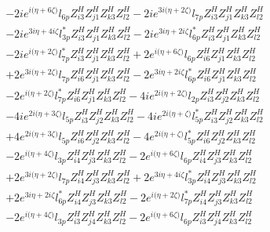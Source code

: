 \begin{align}
 &-2 i e^{i \Big(\eta +6 \zeta \Big)} l_{6p} Z_{{i 3}}^{H} Z_{{j 1}}^{H} Z_{{k 3}}^{H} Z_{{l 2}}^{H} -2 i e^{3 i \Big(\eta +2 \zeta \Big)} l_{7p} Z_{{i 3}}^{H} Z_{{j 1}}^{H} Z_{{k 3}}^{H} Z_{{l 2}}^{H} \nonumber \\ 
 &-2 i e^{3 i \eta +4 i \zeta } l_{3p}^* Z_{{i 3}}^{H} Z_{{j 1}}^{H} Z_{{k 3}}^{H} Z_{{l 2}}^{H} -2 i e^{3 i \eta +2 i \zeta } l_{6p}^* Z_{{i 3}}^{H} Z_{{j 1}}^{H} Z_{{k 3}}^{H} Z_{{l 2}}^{H} \nonumber \\ 
 &-2 i e^{i \Big(\eta +2 \zeta \Big)} l_{7p}^* Z_{{i 3}}^{H} Z_{{j 1}}^{H} Z_{{k 3}}^{H} Z_{{l 2}}^{H} +2 e^{i \Big(\eta +6 \zeta \Big)} l_{6p} Z_{{i 6}}^{H} Z_{{j 1}}^{H} Z_{{k 3}}^{H} Z_{{l 2}}^{H} \nonumber \\ 
 &+2 e^{3 i \Big(\eta +2 \zeta \Big)} l_{7p} Z_{{i 6}}^{H} Z_{{j 1}}^{H} Z_{{k 3}}^{H} Z_{{l 2}}^{H} -2 e^{3 i \eta +2 i \zeta } l_{6p}^* Z_{{i 6}}^{H} Z_{{j 1}}^{H} Z_{{k 3}}^{H} Z_{{l 2}}^{H} \nonumber \\ 
 &-2 e^{i \Big(\eta +2 \zeta \Big)} l_{7p}^* Z_{{i 6}}^{H} Z_{{j 1}}^{H} Z_{{k 3}}^{H} Z_{{l 2}}^{H} -4 i e^{2 i \Big(\eta +2 \zeta \Big)} l_{2p} Z_{{i 3}}^{H} Z_{{j 2}}^{H} Z_{{k 3}}^{H} Z_{{l 2}}^{H} \nonumber \\ 
 &-4 i e^{2 i \Big(\eta +3 \zeta \Big)} l_{5p} Z_{{i 3}}^{H} Z_{{j 2}}^{H} Z_{{k 3}}^{H} Z_{{l 2}}^{H} -4 i e^{2 i \Big(\eta +\zeta \Big)} l_{5p}^* Z_{{i 3}}^{H} Z_{{j 2}}^{H} Z_{{k 3}}^{H} Z_{{l 2}}^{H} \nonumber \\ 
 &+4 e^{2 i \Big(\eta +3 \zeta \Big)} l_{5p} Z_{{i 6}}^{H} Z_{{j 2}}^{H} Z_{{k 3}}^{H} Z_{{l 2}}^{H} -4 e^{2 i \Big(\eta +\zeta \Big)} l_{5p}^* Z_{{i 6}}^{H} Z_{{j 2}}^{H} Z_{{k 3}}^{H} Z_{{l 2}}^{H} \nonumber \\ 
 &-2 e^{i \Big(\eta +4 \zeta \Big)} l_{3p} Z_{{i 4}}^{H} Z_{{j 3}}^{H} Z_{{k 3}}^{H} Z_{{l 2}}^{H} -2 e^{i \Big(\eta +6 \zeta \Big)} l_{6p} Z_{{i 4}}^{H} Z_{{j 3}}^{H} Z_{{k 3}}^{H} Z_{{l 2}}^{H} \nonumber \\ 
 &+2 e^{3 i \Big(\eta +2 \zeta \Big)} l_{7p} Z_{{i 4}}^{H} Z_{{j 3}}^{H} Z_{{k 3}}^{H} Z_{{l 2}}^{H} +2 e^{3 i \eta +4 i \zeta } l_{3p}^* Z_{{i 4}}^{H} Z_{{j 3}}^{H} Z_{{k 3}}^{H} Z_{{l 2}}^{H} \nonumber \\ 
 &+2 e^{3 i \eta +2 i \zeta } l_{6p}^* Z_{{i 4}}^{H} Z_{{j 3}}^{H} Z_{{k 3}}^{H} Z_{{l 2}}^{H} -2 e^{i \Big(\eta +2 \zeta \Big)} l_{7p}^* Z_{{i 4}}^{H} Z_{{j 3}}^{H} Z_{{k 3}}^{H} Z_{{l 2}}^{H} \nonumber \\ 
 &-2 e^{i \Big(\eta +4 \zeta \Big)} l_{3p} Z_{{i 3}}^{H} Z_{{j 4}}^{H} Z_{{k 3}}^{H} Z_{{l 2}}^{H} -2 e^{i \Big(\eta +6 \zeta \Big)} l_{6p} Z_{{i 3}}^{H} Z_{{j 4}}^{H} Z_{{k 3}}^{H} Z_{{l 2}}^{H} \nonumber \\ 

\end{align}

